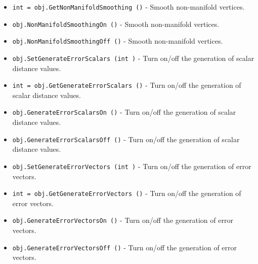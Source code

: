 \begin{itemize}
\item  \verb|int = obj.GetNonManifoldSmoothing ()| -  Smooth non-manifold vertices.

\item  \verb|obj.NonManifoldSmoothingOn ()| -  Smooth non-manifold vertices.

\item  \verb|obj.NonManifoldSmoothingOff ()| -  Smooth non-manifold vertices.

\item  \verb|obj.SetGenerateErrorScalars (int )| -  Turn on/off the generation of scalar distance values.

\item  \verb|int = obj.GetGenerateErrorScalars ()| -  Turn on/off the generation of scalar distance values.

\item  \verb|obj.GenerateErrorScalarsOn ()| -  Turn on/off the generation of scalar distance values.

\item  \verb|obj.GenerateErrorScalarsOff ()| -  Turn on/off the generation of scalar distance values.

\item  \verb|obj.SetGenerateErrorVectors (int )| -  Turn on/off the generation of error vectors.

\item  \verb|int = obj.GetGenerateErrorVectors ()| -  Turn on/off the generation of error vectors.

\item  \verb|obj.GenerateErrorVectorsOn ()| -  Turn on/off the generation of error vectors.

\item  \verb|obj.GenerateErrorVectorsOff ()| -  Turn on/off the generation of error vectors.

\end{itemize}
